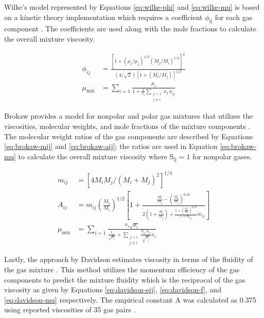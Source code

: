 \documentclass{article}
\begin{document}
\noindent Wilke's model represented by Equations \ref{eq:wilke-phi} and \ref{eq:wilke-mu} is based on a kinetic theory implementation which requires a coefficient $\phi_\text{ij}$ for each gas component \cite{Wilke-1950}. The coefficients are used along with the mole fractions to calculate the overall mixture viscosity.

\begin{align}
    \phi_{ij} &= \frac{\left[1 + (\mu_i/\mu_j)^{1/2} (M_j/M_i)^{1/4}\right]^2}{(4/\sqrt{2}) \left[1 + (M_i/M_j)\right]^{1/2}} \label{eq:wilke-phi} \\
    \mu_{\text{mix}} &= \sum_{i=1} \frac{\mu_i}{1 + \frac{1}{x_i} \sum_{\substack{j=1 \\j \neq i}} x_j \, \phi_{ij}} \label{eq:wilke-mu}
\end{align}

\noindent Brokaw provides a model for nonpolar and polar gas mixtures that utilizes the viscosities, molecular weights, and mole fractions of the mixture components \cite{Brokaw-1968}. The molecular weight ratios of the gas components are described by Equations \ref{eq:brokaw-mij} and \ref{eq:brokaw-aij}; the ratios are used in Equation \ref{eq:brokaw-mu} to calculate the overall mixture viscosity where S$_\text{ij} = 1$ for nonpolar gases.

\begin{align}
    m_{ij} &= \left[ 4 M_i M_j / (M_i + M_j)^2 \right]^{1/4} \label{eq:brokaw-mij} \\
    A_{ij} &= m_{ij}\left( \frac{M_j}{M_i} \right)^{1/2} \left[ 1 + \frac{\frac{M_i}{M_j} - \left(\frac{M_i}{M_j} \right)^{0.45} }{ 2 \left(1 + \frac{M_i}{M_j} \right) + \frac{1 + \left(\frac{M_i}{M_j} \right)^{0.45}}{1 + m_{ij}} m_{ij}} \right] \label{eq:brokaw-aij} \\
    \mu_{\text{mix}} &= \sum_{i=1} \frac{x_i \sqrt{\mu_i}}{\frac{x_i}{\sqrt{\mu_i}} + \sum_{\substack{j=1 \\ j \neq i}} \frac{S_{ij} \, A_{ij}}{\sqrt{\mu_j}} x_j} \label{eq:brokaw-mu}
\end{align}

\noindent Lastly, the approach by Davidson estimates viscosity in terms of the fluidity of the gas mixture \cite{Davidson-1993}. This method utilizes the momentum efficiency of the gas components to predict the mixture fluidity which is the reciprocal of the gas viscosity as given by Equations \ref{eq:davidson-eij}, \ref{eq:davidson-f}, and \ref{eq:davidson-mu} respectively. The empirical constant A was calculated as 0.375 using reported viscosities of 35 gas pairs \cite{Davidson-1993}.
\end{document}
